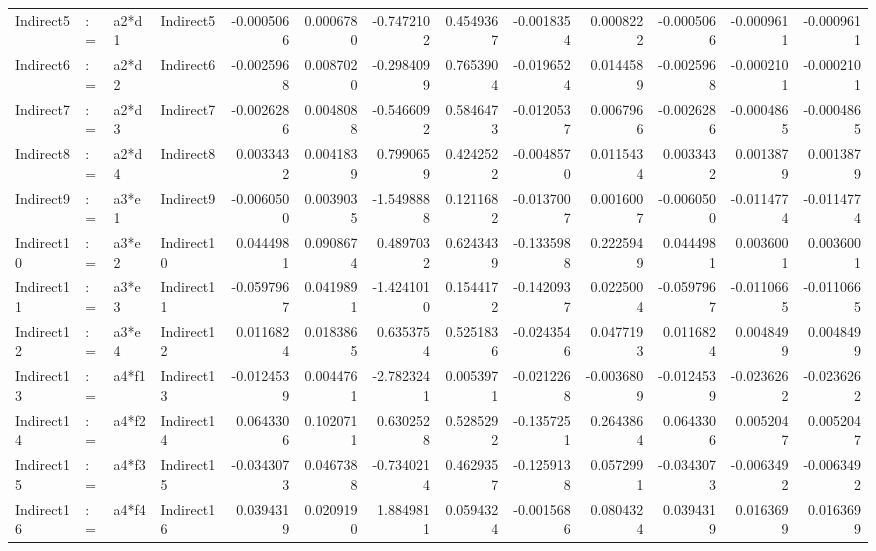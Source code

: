 \documentclass[
]{article}
\begin{document}
\begin{table}[!h]
\begin{tabular}[t]{llllrrrrrrrrr}
Indirect5 & := & a2*d1 & Indirect5 & -0.0005066 & 0.0006780 & -0.7472102 & 0.4549367 & -0.0018354 & 0.0008222 & -0.0005066 & -0.0009611 & -0.0009611\\
Indirect6 & := & a2*d2 & Indirect6 & -0.0025968 & 0.0087020 & -0.2984099 & 0.7653904 & -0.0196524 & 0.0144589 & -0.0025968 & -0.0002101 & -0.0002101\\
Indirect7 & := & a2*d3 & Indirect7 & -0.0026286 & 0.0048088 & -0.5466092 & 0.5846473 & -0.0120537 & 0.0067966 & -0.0026286 & -0.0004865 & -0.0004865\\
\addlinespace
Indirect8 & := & a2*d4 & Indirect8 & 0.0033432 & 0.0041839 & 0.7990659 & 0.4242522 & -0.0048570 & 0.0115434 & 0.0033432 & 0.0013879 & 0.0013879\\
Indirect9 & := & a3*e1 & Indirect9 & -0.0060500 & 0.0039035 & -1.5498888 & 0.1211682 & -0.0137007 & 0.0016007 & -0.0060500 & -0.0114774 & -0.0114774\\
Indirect10 & := & a3*e2 & Indirect10 & 0.0444981 & 0.0908674 & 0.4897032 & 0.6243439 & -0.1335988 & 0.2225949 & 0.0444981 & 0.0036001 & 0.0036001\\
Indirect11 & := & a3*e3 & Indirect11 & -0.0597967 & 0.0419891 & -1.4241010 & 0.1544172 & -0.1420937 & 0.0225004 & -0.0597967 & -0.0110665 & -0.0110665\\
Indirect12 & := & a3*e4 & Indirect12 & 0.0116824 & 0.0183865 & 0.6353754 & 0.5251836 & -0.0243546 & 0.0477193 & 0.0116824 & 0.0048499 & 0.0048499\\
\addlinespace
Indirect13 & := & a4*f1 & Indirect13 & -0.0124539 & 0.0044761 & -2.7823241 & 0.0053971 & -0.0212268 & -0.0036809 & -0.0124539 & -0.0236262 & -0.0236262\\
Indirect14 & := & a4*f2 & Indirect14 & 0.0643306 & 0.1020711 & 0.6302528 & 0.5285292 & -0.1357251 & 0.2643864 & 0.0643306 & 0.0052047 & 0.0052047\\
Indirect15 & := & a4*f3 & Indirect15 & -0.0343073 & 0.0467388 & -0.7340214 & 0.4629357 & -0.1259138 & 0.0572991 & -0.0343073 & -0.0063492 & -0.0063492\\
Indirect16 & := & a4*f4 & Indirect16 & 0.0394319 & 0.0209190 & 1.8849811 & 0.0594324 & -0.0015686 & 0.0804324 & 0.0394319 & 0.0163699 & 0.0163699\\
\bottomrule
\end{tabular}
\end{table}
\end{document}
